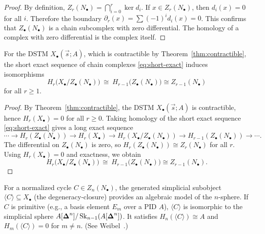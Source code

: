 \begin{proof}
By definition, $Z_r(N_\bullet) = \bigcap_{i=0}^r \ker d_i$.
If $x \in Z_r(N_\bullet)$, then $d_i(x)=0$ for all $i$. Therefore the boundary
$\partial_r(x) = \sum (-1)^i d_i(x) = 0$. This confirms that
$Z_\bullet(N_\bullet)$ is a chain subcomplex with zero differential.
The homology of a complex with zero differential is the complex itself.
\end{proof}

\begin{corollary}\label{cor:normalized-cycle-quotient}
For the DSTM $X_\bullet(\vec{s};A)$, which is contractible by Theorem~\ref{thm:contractible},
the short exact sequence of chain complexes \eqref{eq:short-exact} induces isomorphisms
\[
H_r\!\bigl(X_\bullet/Z_\bullet(N_\bullet)\bigr)\ \cong\ H_{r-1}\!\bigl(Z_\bullet(N_\bullet)\bigr) \cong Z_{r-1}(N_\bullet)
\]
for all $r\ge 1$.
\end{corollary}

\begin{proof}
By Theorem~\ref{thm:contractible}, the DSTM $X_\bullet(\vec{s};A)$ is contractible, hence
$H_r(X_\bullet)=0$ for all $r\ge 0$.
Taking homology of the short exact sequence \eqref{eq:short-exact} gives a long exact sequence
\[
\cdots\to H_r(Z_\bullet(N_\bullet))\to H_r(X_\bullet)\to
H_r(X_\bullet/Z_\bullet(N_\bullet))\to H_{r-1}(Z_\bullet(N_\bullet))\to\cdots.
\]
The differential on $Z_\bullet(N_\bullet)$ is zero, so
$H_r(Z_\bullet(N_\bullet))\cong Z_r(N_\bullet)$ for all $r$.
Using $H_r(X_\bullet)=0$ and exactness, we obtain
\[
H_r\!\bigl(X_\bullet/Z_\bullet(N_\bullet)\bigr)\ \cong\ H_{r-1}\!\bigl(Z_\bullet(N_\bullet)\bigr)
\cong Z_{r-1}(N_\bullet).
\]
\end{proof}

\begin{remark}
For a normalized cycle $C\in Z_n(N_\bullet)$, the generated simplicial subobject $\langle C \rangle \subseteq X_\bullet$ (the degeneracy-closure) provides an algebraic model of the $n$-sphere. If $C$ is primitive (e.g., a basis element $E_m$ over a PID $A$), $\langle C \rangle$ is isomorphic to the simplicial sphere $A[\boldsymbol{\Delta}^n]/\operatorname{Sk}_{n-1}(A[\boldsymbol{\Delta}^n])$. It satisfies $H_n(\langle C \rangle)\cong A$ and $H_m(\langle C \rangle)=0$ for $m\ne n$. (See Weibel~\cite[Exercise 8.3.4]{Weibel}.)
\end{remark}
